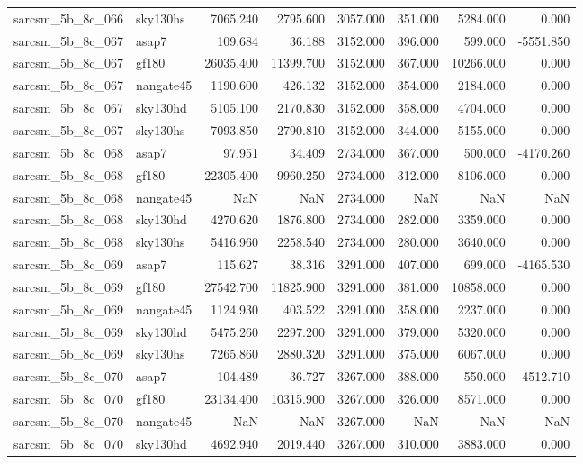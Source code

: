 \begin{tabular}{llrrrrrr}
sarcsm\_5b\_8c\_066 & sky130hs & 7065.240 & 2795.600 & 3057.000 & 351.000 & 5284.000 & 0.000 \\
sarcsm\_5b\_8c\_067 & asap7 & 109.684 & 36.188 & 3152.000 & 396.000 & 599.000 & -5551.850 \\
sarcsm\_5b\_8c\_067 & gf180 & 26035.400 & 11399.700 & 3152.000 & 367.000 & 10266.000 & 0.000 \\
sarcsm\_5b\_8c\_067 & nangate45 & 1190.600 & 426.132 & 3152.000 & 354.000 & 2184.000 & 0.000 \\
sarcsm\_5b\_8c\_067 & sky130hd & 5105.100 & 2170.830 & 3152.000 & 358.000 & 4704.000 & 0.000 \\
sarcsm\_5b\_8c\_067 & sky130hs & 7093.850 & 2790.810 & 3152.000 & 344.000 & 5155.000 & 0.000 \\
sarcsm\_5b\_8c\_068 & asap7 & 97.951 & 34.409 & 2734.000 & 367.000 & 500.000 & -4170.260 \\
sarcsm\_5b\_8c\_068 & gf180 & 22305.400 & 9960.250 & 2734.000 & 312.000 & 8106.000 & 0.000 \\
sarcsm\_5b\_8c\_068 & nangate45 & NaN & NaN & 2734.000 & NaN & NaN & NaN \\
sarcsm\_5b\_8c\_068 & sky130hd & 4270.620 & 1876.800 & 2734.000 & 282.000 & 3359.000 & 0.000 \\
sarcsm\_5b\_8c\_068 & sky130hs & 5416.960 & 2258.540 & 2734.000 & 280.000 & 3640.000 & 0.000 \\
sarcsm\_5b\_8c\_069 & asap7 & 115.627 & 38.316 & 3291.000 & 407.000 & 699.000 & -4165.530 \\
sarcsm\_5b\_8c\_069 & gf180 & 27542.700 & 11825.900 & 3291.000 & 381.000 & 10858.000 & 0.000 \\
sarcsm\_5b\_8c\_069 & nangate45 & 1124.930 & 403.522 & 3291.000 & 358.000 & 2237.000 & 0.000 \\
sarcsm\_5b\_8c\_069 & sky130hd & 5475.260 & 2297.200 & 3291.000 & 379.000 & 5320.000 & 0.000 \\
sarcsm\_5b\_8c\_069 & sky130hs & 7265.860 & 2880.320 & 3291.000 & 375.000 & 6067.000 & 0.000 \\
sarcsm\_5b\_8c\_070 & asap7 & 104.489 & 36.727 & 3267.000 & 388.000 & 550.000 & -4512.710 \\
sarcsm\_5b\_8c\_070 & gf180 & 23134.400 & 10315.900 & 3267.000 & 326.000 & 8571.000 & 0.000 \\
sarcsm\_5b\_8c\_070 & nangate45 & NaN & NaN & 3267.000 & NaN & NaN & NaN \\
sarcsm\_5b\_8c\_070 & sky130hd & 4692.940 & 2019.440 & 3267.000 & 310.000 & 3883.000 & 0.000 \\

\end{tabular}
